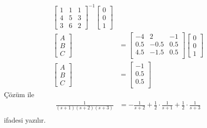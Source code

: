\begin{enumerate}[\bfseries S1.]
\begin{equation}
\begin{split}
\begin{bmatrix}
            1& 1& 1\\
            4& 5& 3\\
            3& 6& 2
        \end{bmatrix}^{-1}\begin{bmatrix}0\\0\\1\end{bmatrix}\\
        \begin{bmatrix}A\\B\\C\end{bmatrix}&=\begin{bmatrix}
            -4 &   2   &    -1\\
            0.5&   -0.5&    0.5\\
            4.5&   -1.5&    0.5\\
        \end{bmatrix}\begin{bmatrix}0\\0\\1\end{bmatrix}\\
        \begin{bmatrix}A\\B\\C\end{bmatrix}&=\begin{bmatrix}
        -1\\
        0.5\\
        0.5\\
        \end{bmatrix}
        \end{split}
    \end{equation}
    Çözüm ile
    \begin{equation}
        \begin{split}
            \frac{1}{(s+1)(s+2)(s+3)}&=-\frac{1}{s+2}+\frac{1}{2}\cdot\frac{1}{s+1}+\frac{1}{2}\cdot\frac{1}{s+3}\\
        \end{split}
    \end{equation}
    ifadesi yazılır.

\end{enumerate}
